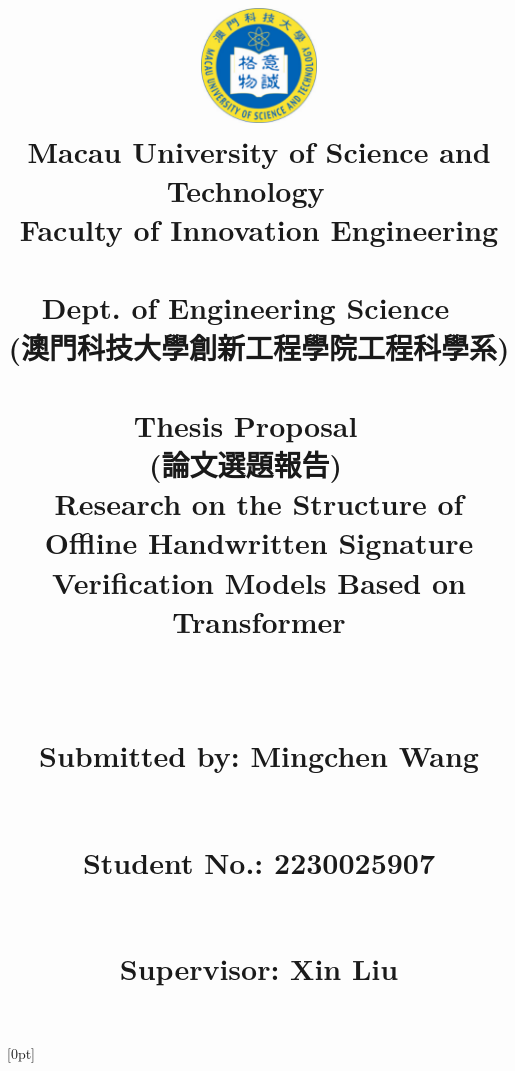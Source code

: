 \documentclass{article}
\begin{document}
\title{\includegraphics[width=1.2in]{MUST.png}\\[-2pt]\huge Macau University of Science and Technology
	~\\
	Faculty of Innovation Engineering
	~\\
	Dept. of Engineering Science
	~\\
	\LARGE{(澳門科技大學創新工程學院工程科學系)}
	~\\[40pt]

	Thesis Proposal
	~\\
	(論文選題報告)
	~\\[40pt]

	\textbf{\LARGE Research on the Structure of Offline Handwritten Signature Verification Models Based on Transformer}

	\title{}

	~\\[50pt]





	\large{

		Submitted by: Mingchen Wang


		~\\[1pt]

		Student No.: 2230025907

		~\\[1pt]

		Supervisor: Xin Liu}

}

\author{}

\date{}


[0pt]{\addvspace{5pt}\filright}
{\contentspush{\thecontentslabel\
	}}
{}{\contentspage}


\maketitle
\thispagestyle{empty}

\clearpage
\end{document}
